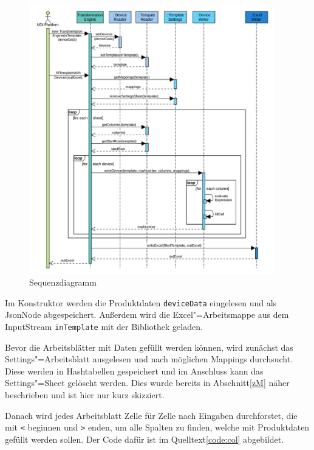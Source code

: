 \begin{figure}[h]
 \centering
 \includegraphics[width=0.95\textwidth]{Bilder/Sequenzdiagramm1}
 \caption[Sequenzdiagramm für Ansatz\nbs\ref{ED}]{Sequenzdiagramm}
 \label{fig:seq1}
\end{figure}

Im Konstruktor werden die Produktdaten \texttt{deviceData} eingelesen und als JsonNode abgespeichert. Außerdem wird die Excel"=Arbeitsmappe aus dem InputStream \texttt{inTemplate} mit der Bibliothek  geladen. 

Bevor die Arbeitsblätter mit Daten gefüllt werden können, wird zunächst das Settings"=Arbeitsblatt ausgelesen und nach möglichen Mappings durchsucht. Diese werden in Hashtabellen gespeichert und im Anschluss kann das Settings"=Sheet gelöscht werden. Dies wurde bereits in Abschnitt\nbs\ref{zM} näher beschrieben und ist hier nur kurz skizziert.

Danach wird jedes Arbeitsblatt Zelle für Zelle nach Eingaben durchforstet, die mit \texttt{<} beginnen und \texttt{>} enden, um alle Spalten zu finden, welche mit Produktdaten gefüllt werden sollen. Der Code dafür ist im Quelltext\nbs\ref{code:col} abgebildet. 

